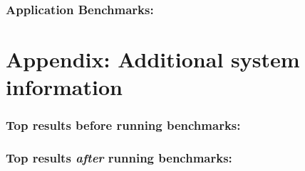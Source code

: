 \documentclass{article}
\begin{document}
\subsubsection*{Application Benchmarks:}
{\footnotesize
}

\section{Appendix: Additional system information}

\subsubsection*{Top results before running benchmarks:}
{
\footnotesize

}
\subsubsection*{Top results {\em after} running benchmarks:}
{
\footnotesize

}
\end{document}
